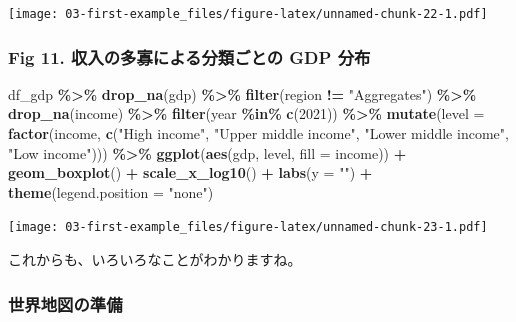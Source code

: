 \documentclass[
  xelatex, ja=standard]{bxjsbook}
\newenvironment{Shaded}{\begin{snugshade}}{\end{snugshade}}
\newcommand{\AttributeTok}[1]{\textcolor[rgb]{0.13,0.29,0.53}{#1}}
\newcommand{\DecValTok}[1]{\textcolor[rgb]{0.00,0.00,0.81}{#1}}
\newcommand{\FunctionTok}[1]{\textcolor[rgb]{0.13,0.29,0.53}{\textbf{#1}}}
\newcommand{\NormalTok}[1]{#1}
\newcommand{\SpecialCharTok}[1]{\textcolor[rgb]{0.81,0.36,0.00}{\textbf{#1}}}
\newcommand{\StringTok}[1]{\textcolor[rgb]{0.31,0.60,0.02}{#1}}
\theoremstyle{definition}
\theoremstyle{definition}
\theoremstyle{definition}
\theoremstyle{definition}
\theoremstyle{remark}
\begin{document}
\texttt{[image: 03-first-example\_files/figure-latex/unnamed-chunk-22-1.pdf]}

\hypertarget{fig-11.-ux53ceux5165ux306eux591aux5be1ux306bux3088ux308bux5206ux985eux3054ux3068ux306e-gdp-ux5206ux5e03}{%
\subsubsection{Fig 11. 収入の多寡による分類ごとの GDP 分布}\label{fig-11.-ux53ceux5165ux306eux591aux5be1ux306bux3088ux308bux5206ux985eux3054ux3068ux306e-gdp-ux5206ux5e03}}

\begin{Shaded}
\begin{Highlighting}[]
\NormalTok{df\_gdp }\SpecialCharTok{\%\textgreater{}\%} \FunctionTok{drop\_na}\NormalTok{(gdp) }\SpecialCharTok{\%\textgreater{}\%} \FunctionTok{filter}\NormalTok{(region }\SpecialCharTok{!=} \StringTok{"Aggregates"}\NormalTok{) }\SpecialCharTok{\%\textgreater{}\%}
  \FunctionTok{drop\_na}\NormalTok{(income) }\SpecialCharTok{\%\textgreater{}\%} \FunctionTok{filter}\NormalTok{(year }\SpecialCharTok{\%in\%} \FunctionTok{c}\NormalTok{(}\DecValTok{2021}\NormalTok{)) }\SpecialCharTok{\%\textgreater{}\%}
  \FunctionTok{mutate}\NormalTok{(}\AttributeTok{level =} \FunctionTok{factor}\NormalTok{(income, }\FunctionTok{c}\NormalTok{(}\StringTok{"High income"}\NormalTok{, }\StringTok{"Upper middle income"}\NormalTok{, }\StringTok{"Lower middle income"}\NormalTok{, }\StringTok{"Low income"}\NormalTok{))) }\SpecialCharTok{\%\textgreater{}\%}
  \FunctionTok{ggplot}\NormalTok{(}\FunctionTok{aes}\NormalTok{(gdp, level, }\AttributeTok{fill =}\NormalTok{ income)) }\SpecialCharTok{+} 
  \FunctionTok{geom\_boxplot}\NormalTok{() }\SpecialCharTok{+} \FunctionTok{scale\_x\_log10}\NormalTok{() }\SpecialCharTok{+} \FunctionTok{labs}\NormalTok{(}\AttributeTok{y =} \StringTok{""}\NormalTok{) }\SpecialCharTok{+} 
  \FunctionTok{theme}\NormalTok{(}\AttributeTok{legend.position =} \StringTok{"none"}\NormalTok{)}
\end{Highlighting}
\end{Shaded}

\texttt{[image: 03-first-example\_files/figure-latex/unnamed-chunk-23-1.pdf]}

これからも、いろいろなことがわかりますね。

\hypertarget{ux4e16ux754cux5730ux56f3ux306eux6e96ux5099}{%
\subsubsection{世界地図の準備}\label{ux4e16ux754cux5730ux56f3ux306eux6e96ux5099}}
\end{document}
